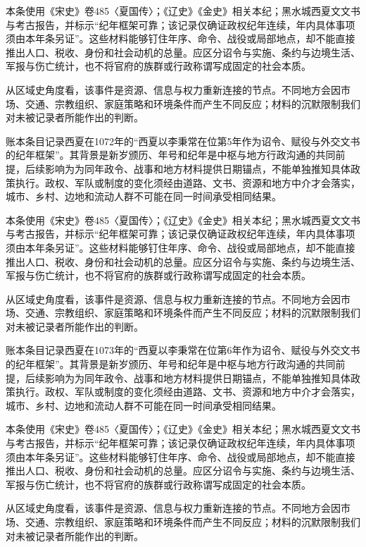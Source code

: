 本条使用《宋史》卷485〈夏国传〉；《辽史》《金史》相关本纪；黑水城西夏文文书与考古报告，并标示“纪年框架可靠；该记录仅确证政权纪年连续，年内具体事项须由本年条另证”。这些材料能够钉住年序、命令、战役或局部地点，却不能直接推出人口、税收、身份和社会动机的总量。应区分诏令与实施、条约与边境生活、军报与伤亡统计，也不将官府的族群或行政称谓写成固定的社会本质。

从区域史角度看，该事件是资源、信息与权力重新连接的节点。不同地方会因市场、交通、宗教组织、家庭策略和环境条件而产生不同反应；材料的沉默限制我们对未被记录者所能作出的判断。

账本条目记录西夏在1072年的“西夏以李秉常在位第5年作为诏令、赋役与外交文书的纪年框架”。其背景是新岁颁历、年号和纪年是中枢与地方行政沟通的共同前提，后续影响为为同年政令、战事和地方材料提供日期锚点，不能单独推知具体政策执行。政权、军队或制度的变化须经由道路、文书、资源和地方中介才会落实，城市、乡村、边地和流动人群不可能在同一时间承受相同结果。

本条使用《宋史》卷485〈夏国传〉；《辽史》《金史》相关本纪；黑水城西夏文文书与考古报告，并标示“纪年框架可靠；该记录仅确证政权纪年连续，年内具体事项须由本年条另证”。这些材料能够钉住年序、命令、战役或局部地点，却不能直接推出人口、税收、身份和社会动机的总量。应区分诏令与实施、条约与边境生活、军报与伤亡统计，也不将官府的族群或行政称谓写成固定的社会本质。

从区域史角度看，该事件是资源、信息与权力重新连接的节点。不同地方会因市场、交通、宗教组织、家庭策略和环境条件而产生不同反应；材料的沉默限制我们对未被记录者所能作出的判断。

账本条目记录西夏在1073年的“西夏以李秉常在位第6年作为诏令、赋役与外交文书的纪年框架”。其背景是新岁颁历、年号和纪年是中枢与地方行政沟通的共同前提，后续影响为为同年政令、战事和地方材料提供日期锚点，不能单独推知具体政策执行。政权、军队或制度的变化须经由道路、文书、资源和地方中介才会落实，城市、乡村、边地和流动人群不可能在同一时间承受相同结果。

本条使用《宋史》卷485〈夏国传〉；《辽史》《金史》相关本纪；黑水城西夏文文书与考古报告，并标示“纪年框架可靠；该记录仅确证政权纪年连续，年内具体事项须由本年条另证”。这些材料能够钉住年序、命令、战役或局部地点，却不能直接推出人口、税收、身份和社会动机的总量。应区分诏令与实施、条约与边境生活、军报与伤亡统计，也不将官府的族群或行政称谓写成固定的社会本质。

从区域史角度看，该事件是资源、信息与权力重新连接的节点。不同地方会因市场、交通、宗教组织、家庭策略和环境条件而产生不同反应；材料的沉默限制我们对未被记录者所能作出的判断。

